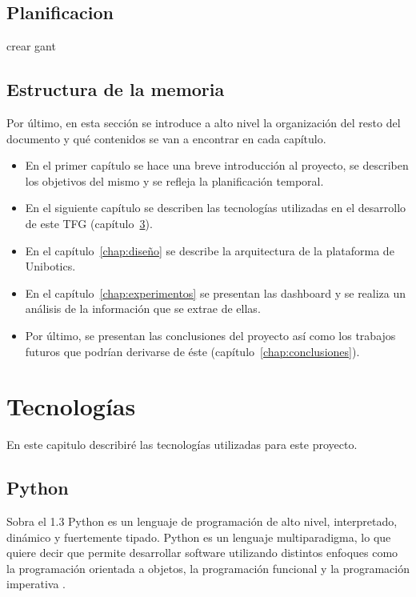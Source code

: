 \documentclass[a4paper, 12pt]{book}
\begin{document}
\section{Planificacion}
\label{sec:objetivos}

crear gant 

\section{Estructura de la memoria}
\label{sec:estructura}

Por último, en esta sección se introduce a alto nivel la organización del resto del documento
y qué contenidos se van a encontrar en cada capítulo.

    \begin{itemize}
      \item En el primer capítulo se hace una breve introducción al proyecto, se describen los objetivos del mismo y se refleja la planificación temporal.
      \item En el siguiente capítulo se describen las tecnologías utilizadas en el desarrollo de este TFG (capítulo~\ref{chap:tecnologias}).
      \item En el capítulo~\ref{chap:diseño} se describe la arquitectura de la plataforma de Unibotics.
      \item En el capítulo~\ref{chap:experimentos} se presentan las dashboard y se realiza un análisis de la información que se extrae de ellas.
      \item Por último, se presentan las conclusiones del proyecto así como los trabajos futuros que podrían derivarse de éste (capítulo~\ref{chap:conclusiones}).
    \end{itemize}

\cleardoublepage


\chapter{Tecnologías}               %
\label{chap:tecnologias}

En este capitulo describiré las tecnologías utilizadas para este proyecto.


\section{Python}
\label{sec:python}
Sobra el 1.3
Python es un lenguaje de programación de alto nivel, interpretado, dinámico y fuertemente tipado. Python es un lenguaje multiparadigma, lo que quiere decir que permite desarrollar software utilizando distintos enfoques como la programación orientada a objetos, la programación funcional y
la programación imperativa \cite{intropython}.
\end{document}

